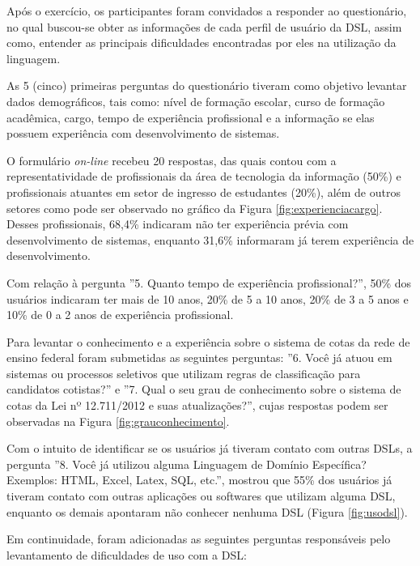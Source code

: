 Após o exercício, os participantes foram convidados a responder ao questionário, no qual buscou-se obter as informações de cada perfil de usuário da DSL, assim como, entender as principais dificuldades encontradas por eles na utilização da linguagem.

As 5 (cinco) primeiras perguntas do questionário tiveram como objetivo levantar dados demográficos, tais como: nível de formação escolar, curso de formação acadêmica, cargo, tempo de experiência profissional e a informação se elas possuem experiência com desenvolvimento de sistemas.

O formulário \textit{on-line} recebeu 20 respostas, das quais contou com a representatividade de profissionais da área de tecnologia da informação (50\%) e profissionais atuantes em setor de ingresso de estudantes (20\%), além de outros setores como pode ser observado no gráfico da Figura \ref{fig:experienciacargo}. Desses profissionais, 68,4\% indicaram não ter experiência prévia com desenvolvimento de sistemas, enquanto 31,6\% informaram já terem experiência de desenvolvimento.



Com relação à pergunta ''5. Quanto tempo de experiência profissional?'', 50\% dos usuários indicaram ter mais de 10 anos, 20\% de 5 a 10 anos, 20\% de 3 a 5 anos e 10\% de 0 a 2 anos de experiência profissional.  

\newpage
Para levantar o conhecimento e a experiência sobre o sistema de cotas da rede de ensino federal foram submetidas as seguintes perguntas: ''6. Você já atuou em sistemas ou processos seletivos que utilizam regras de classificação para candidatos cotistas?'' e ''7. Qual o seu grau de conhecimento sobre o sistema de cotas da Lei nº 12.711/2012 e suas atualizações?'', cujas respostas podem ser observadas na Figura \ref{fig:grauconhecimento}.



Com o intuito de identificar se os usuários já tiveram contato com outras DSLs, a pergunta ''8. Você já utilizou alguma Linguagem de Domínio Específica? Exemplos: HTML, Excel, Latex, SQL, etc.'', mostrou que 55\% dos usuários já tiveram contato com outras aplicações ou softwares que utilizam alguma \gls{DSL}, enquanto os demais apontaram não conhecer nenhuma DSL (Figura \ref{fig:usodsl}).



\newpage
Em continuidade, foram adicionadas as seguintes perguntas responsáveis pelo levantamento de dificuldades de uso com a DSL:

